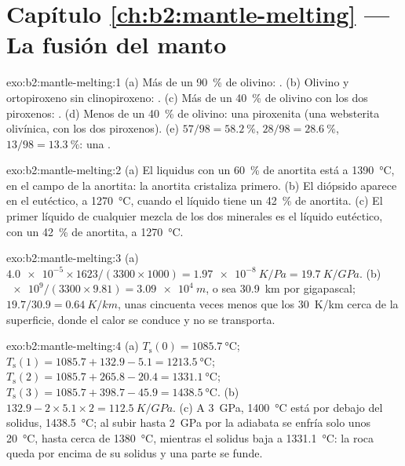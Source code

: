 \section*{Capítulo \ref{ch:b2:mantle-melting} --- La fusión del manto}

\begin{solution}{exo:b2:mantle-melting:1}
(a) Más de un \qty{90}{\percent} de olivino: . (b) Olivino y ortopiroxeno
sin clinopiroxeno: . (c) Más de un \qty{40}{\percent} de olivino con
los dos piroxenos: . (d) Menos de un \qty{40}{\percent} de olivino: una piroxenita
(una websterita olivínica, con los dos piroxenos). (e) $57/98 = \qty{58.2}{\percent}$,
$28/98 = \qty{28.6}{\percent}$, $13/98 = \qty{13.3}{\percent}$: una .
\end{solution}

\begin{solution}{exo:b2:mantle-melting:2}
(a) El liquidus con un \qty{60}{\percent} de anortita está a \qty{1390}{\celsius}, en el
campo de la anortita: la anortita cristaliza primero. (b) El diópsido aparece en el
eutéctico, a \qty{1270}{\celsius}, cuando el líquido tiene un \qty{42}{\percent} de anortita.
(c) El primer líquido de cualquier mezcla de los dos minerales es el líquido eutéctico,
con un \qty{42}{\percent} de anortita, a \qty{1270}{\celsius}.
\end{solution}

\begin{solution}{exo:b2:mantle-melting:3}
(a) $\num{4.0e-5}\times1623/(3300\times1000) = \qty{1.97e-8}{K/Pa} =
\qty{19.7}{K/GPa}$. (b) $\num{e9}/(3300\times9.81) = \qty{3.09e4}{m}$, o sea
\qty{30.9}{km} por gigapascal; $19.7/30.9 = \qty{0.64}{K/km}$, unas cincuenta veces
menos que los \qty{30}{K/km} cerca de la superficie, donde el calor se conduce y no se
transporta.
\end{solution}

\begin{solution}{exo:b2:mantle-melting:4}
(a) $T_{\mathrm s}(0) = \qty{1085.7}{\celsius}$; $T_{\mathrm s}(1) = 1085.7 +
132.9 - 5.1 = \qty{1213.5}{\celsius}$; $T_{\mathrm s}(2) = 1085.7 + 265.8 - 20.4 =
\qty{1331.1}{\celsius}$; $T_{\mathrm s}(3) = 1085.7 + 398.7 - 45.9 =
\qty{1438.5}{\celsius}$. (b) $132.9 - 2\times5.1\times2 = \qty{112.5}{K/GPa}$.
(c) A \qty{3}{GPa}, \qty{1400}{\celsius} está por debajo del solidus,
\qty{1438.5}{\celsius}; al subir hasta \qty{2}{GPa} por la adiabata se enfría solo
unos \qty{20}{\celsius}, hasta cerca de \qty{1380}{\celsius}, mientras el solidus baja a
\qty{1331.1}{\celsius}: la roca queda por encima de su solidus y una parte se funde.
\end{solution}

